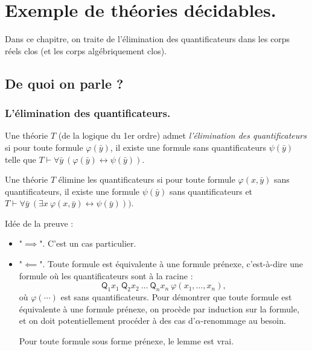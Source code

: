 \documentclass[./main]{subfiles}
\begin{document}
  \chapter{Exemple de théories décidables.}

  Dans ce chapitre, on traite de l'élimination des quantificateurs dans les corps réels clos (et les corps algébriquement clos).

  \section{De quoi on parle ?}
  \subsection{L'élimination des quantificateurs.}



  \begin{defn}
    Une théorie $T$ (de la logique du 1er ordre) admet \textit{l'élimination des quantificateurs} si pour toute formule $\varphi(\bar{y})$, il existe une formule sans quantificateurs $\psi(\bar{y})$ telle que $T \vdash \forall \bar{y} \: (\varphi(\bar{y}) \leftrightarrow \psi(\bar{y}))$.
  \end{defn}

  \begin{lem}
    Une théorie $T$ élimine les quantificateurs si pour toute formule $\varphi(x, \bar{y})$ sans quantificateurs, il existe une formule $\psi(\bar{y})$ sans quantificateurs et $T \vdash \forall \bar{y}\: (\exists x \: \varphi(x, \bar{y}) \leftrightarrow \psi(\bar{y})))$.
  \end{lem}
  \begin{prv}
    Idée de la preuve :
    \begin{itemize}
      \item "$\implies$". C'est un cas particulier.
      \item "$\impliedby$".
        Toute formule est équivalente à une formule prénexe, c'est-à-dire une formule où les quantificateurs sont à la racine :
        \[
        \mathsf{Q}_1 x_1 \: \mathsf{Q}_2 x_2 \:\ldots \: \mathsf{Q}_n x_n \: \varphi(x_1, \ldots, x_n)
        ,\] 
        où $\varphi(\cdots)$ est sans quantificateurs.
        Pour démontrer que toute formule est équivalente à une formule prénexe, on procède par induction sur la formule, et on doit potentiellement procéder à des cas d'$\alpha$-renommage au besoin.


        Pour toute formule sous forme prénexe, le lemme est vrai.
    \end{itemize}
  \end{prv}
\end{document}
